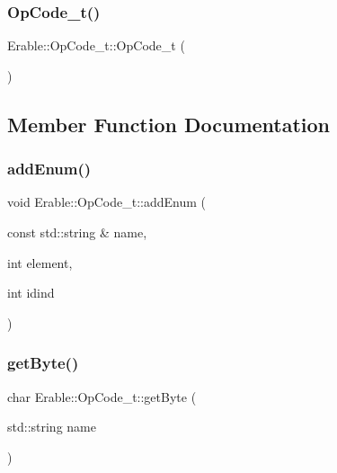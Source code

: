 \subsubsection{\texorpdfstring{OpCode\_t()}{OpCode\_t()}}
{\footnotesize\ttfamily Erable\+::\+Op\+Code\+\_\+t\+::\+Op\+Code\+\_\+t (\begin{DoxyParamCaption}{ }\end{DoxyParamCaption})\hspace{0.3cm}{\ttfamily [inline]}}



\subsection{Member Function Documentation}
\mbox{\label{class_erable_1_1_op_code__t_a7075ff722bb9fa8b219315c2bf078358}} 
\subsubsection{\texorpdfstring{addEnum()}{addEnum()}}
{\footnotesize\ttfamily void Erable\+::\+Op\+Code\+\_\+t\+::add\+Enum (\begin{DoxyParamCaption}\item[{const std\+::string \&}]{name,  }\item[{int}]{element,  }\item[{int}]{idind }\end{DoxyParamCaption})\hspace{0.3cm}{\ttfamily [inline]}}

\mbox{\label{class_erable_1_1_op_code__t_a97081fa02af38bdf126a22cbf0345e3a}} 
\subsubsection{\texorpdfstring{getByte()}{getByte()}}
{\footnotesize\ttfamily char Erable\+::\+Op\+Code\+\_\+t\+::get\+Byte (\begin{DoxyParamCaption}\item[{std\+::string}]{name }\end{DoxyParamCaption})\hspace{0.3cm}{\ttfamily [inline]}}


